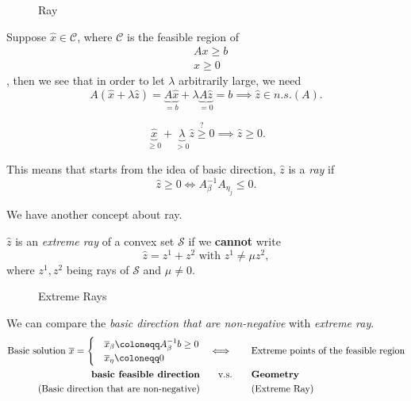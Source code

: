 \begin{figure}[H]
	\centering
	\caption{Ray}
	\label{fig:ray}
\end{figure}

Suppose \(\hat{x}\in\mathcal{C}\), where \(\mathcal{C}\) is the feasible region of
\begin{align*}
	 & Ax \geq  b \\
	 & x\geq 0
\end{align*},
then we see that in order to let \(\lambda\) arbitrarily large, we need
\[
	A(\hat{x} + \lambda \hat{z}) = \underbrace{A \hat{x}}_{=b} + \lambda \underbrace{A \hat{z}}_{=0} = b\implies \hat{z} \in n.s.(A).
\]

\begin{problem}
\[
	\underbrace{\hat{x}}_{\geq 0} + \underbrace{\lambda}_{>0} \hat{z} \overset{?}{\geq} 0 \implies \hat{z} \geq 0.
\]
\end{problem}

This means that starts from the idea of basic direction, \(\hat{z}\) is a \emph{ray} if
\[
	\hat{z} \geq 0 \iff A^{-1}_{\beta}A_{\eta_j} \leq 0.
\]

We have another concept about ray.
\begin{definition}
	\(\hat{z}\) is an \emph{extreme ray} of a convex set \(\mathcal{S}\) if we \textbf{cannot} write
	\[
		\hat{z} = z^1 + z^2 \text{ with }z^1 \neq \mu z^2,
	\]
	where \(z^1, z^2\) being rays of \(\mathcal{S}\) and \(\mu\neq 0\).
\end{definition}
\begin{figure}[H]
	\centering
	\caption{Extreme Rays}
	\label{fig:extreme-ray}
\end{figure}

\begin{summary}
	We can compare the \emph{basic direction that are non-negative} with \emph{extreme ray}.
	\[
		\begin{alignedat}{4}
			\text{Basic solution }\overline{x}=\begin{cases}
				 & \overline{x}_{\beta}\coloneqq A^{-1}_{\beta}b\geq 0 \\
				 & \overline{x}_{\eta}\coloneqq 0
			\end{cases} &&\quad\iff\qquad&\text{Extreme points of the feasible region}\\
			\text{\textbf{basic feasible direction}} && \quad\text{v.s.}\qquad&\text{\textbf{Geometry}}\\
			\text{(Basic direction that are non-negative)}&& &\text{(Extreme Ray)}
		\end{alignedat}
	\]
\end{summary}